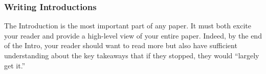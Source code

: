 \documentclass[oneside,11pt]{book}
\begin{document}

\subsubsection{Writing Introductions}
The Introduction is the most important part of any paper. It must both excite your reader and provide a high-level view of your entire paper. Indeed, by the end of the Intro, your reader should want to read more but also have sufficient understanding about the key takeaways that if they stopped, they would ``largely get it.'' 
\end{document}
